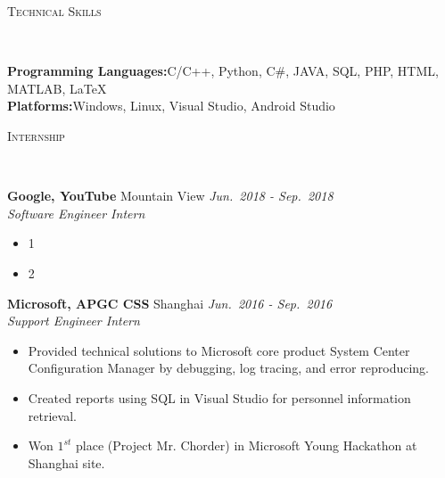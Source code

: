 \documentclass[10pt]{article}
\newenvironment{changemargin}[2]{%
  \begin{list}{}{%
    \setlength{\topsep}{0pt}%
    \setlength{\leftmargin}{#1}%
    \setlength{\rightmargin}{#2}%
    \setlength{\listparindent}{\parindent}%
    \setlength{\itemindent}{\parindent}%
    \setlength{\parsep}{\parskip}%
  }%
  \item[]}{\end{list}
}
\newcommand{\lineover}{
	\begin{changemargin}{-0.05in}{-0.05in}
		\vspace*{-8pt}
		\hrulefill \\
		\vspace*{-2pt}
	\end{changemargin}
}
\newcommand{\header}[1]{
	\begin{changemargin}{-0.7in}{-0.65in}
		\scshape{\large{#1}}\\
  	\lineover
	\end{changemargin}
}
\newenvironment{body} {
	\vspace*{-16pt}
	\begin{changemargin}{-0.65in}{-0.62in}
  }	
	{\end{changemargin}
}
\begin{document}
\header{Technical Skills}

\begin{body}
	\vspace{14pt}
	\textbf{Programming Languages:\hspace{10pt}}C/C++, Python, C\#, JAVA, SQL, PHP, HTML, MATLAB, \LaTeX\\
	\textbf{Platforms:\hspace{85pt}}Windows, Linux, Visual Studio, Android Studio\\
	
\end{body}

\smallskip
\vspace{-4pt}

\header{Internship}

\begin{body}
	\vspace{14pt}
	
	\textbf{Google, YouTube} Mountain View \hfill \emph{Jun.~2018 - Sep.~2018} \\
	\textit{Software Engineer Intern} 
	\vspace*{-5pt}
	\vspace*{2pt}
	\begin{itemize} \itemsep -0pt		
		
		\item 1
		\item 2
	\end{itemize}

	\vspace{-2pt}
	
	\textbf{Microsoft, APGC CSS} Shanghai \hfill \emph{Jun.~2016 - Sep.~2016} \\
	\textit{Support Engineer Intern} 
	\vspace*{-5pt}
	\vspace*{2pt}
	\begin{itemize} \itemsep -0pt		
		
		\item Provided technical solutions to Microsoft core product System Center Configuration Manager by debugging, log tracing, and error reproducing.
		\item Created reports using SQL in Visual Studio for personnel information retrieval.
		\item Won $1^{st}$ place (Project Mr. Chorder) in Microsoft Young Hackathon at Shanghai site.
	\end{itemize}


\end{body}
\end{document}
